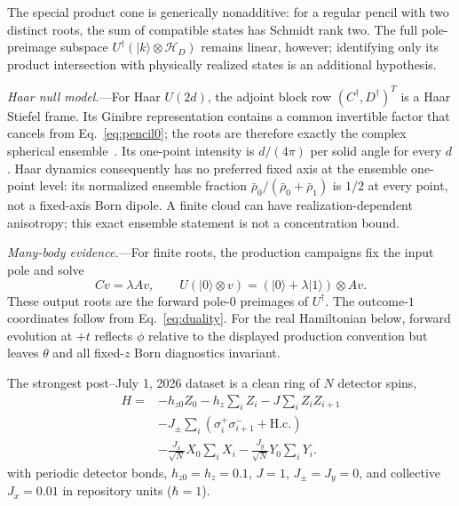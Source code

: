 \documentclass[aps,prl,reprint,superscriptaddress,nofootinbib]{revtex4-2}
\begin{document}
The special product cone is generically nonadditive: for a regular pencil with two distinct roots, the sum of compatible states has Schmidt rank two.  The full pole-preimage subspace $U^\dagger(|k\rangle\otimes\mathcal H_D)$ remains linear, however; identifying only its product intersection with physically realized states is an additional hypothesis.

\emph{Haar null model.}---For Haar $U(2d)$, the adjoint block row $(C^\dagger,D^\dagger)^T$ is a Haar Stiefel frame.  Its Ginibre representation contains a common invertible factor that cancels from Eq.~\eqref{eq:pencil0}; the roots are therefore exactly the complex spherical ensemble~\cite{Krishnapur2009,AlishahiZamani2015}.  Its one-point intensity is $d/(4\pi)$ per solid angle for every $d$.  Haar dynamics consequently has no preferred fixed axis at the ensemble one-point level: its normalized ensemble fraction $\bar\rho_0/(\bar\rho_0+\bar\rho_1)$ is $1/2$ at every point, not a fixed-axis Born dipole.  A finite cloud can have realization-dependent anisotropy; this exact ensemble statement is not a concentration bound.

\emph{Many-body evidence.}---For finite roots, the production campaigns fix the input pole and solve
\begin{equation}
 Cv=\lambda Av,\qquad U(|0\rangle\otimes v)=(|0\rangle+\lambda|1\rangle)\otimes Av. \label{eq:production}
\end{equation}
These output roots are the forward pole-$0$ preimages of $U^\dagger$.  The outcome-$1$ coordinates follow from Eq.~\eqref{eq:duality}.  For the real Hamiltonian below, forward evolution at $+t$ reflects $\phi$ relative to the displayed production convention but leaves $\theta$ and all fixed-$z$ Born diagnostics invariant.

The strongest post--July 1, 2026 dataset is a clean ring of $N$ detector spins,
\begin{align}
H={}&-h_{z0}Z_0-h_z\sum_iZ_i-J\sum_iZ_iZ_{i+1}\nonumber\\
&-J_{\pm}\sum_i(\sigma_i^+\sigma_{i+1}^-+\mathrm{H.c.})\nonumber\\
&-\frac{J_x}{\sqrt N}X_0\sum_iX_i-\frac{J_y}{\sqrt N}Y_0\sum_iY_i.              \label{eq:H}
\end{align}
with periodic detector bonds, $h_{z0}=h_z=0.1$, $J=1$, $J_\pm=J_y=0$, and collective $J_x=0.01$ in repository units ($\hbar=1$).
\end{document}
